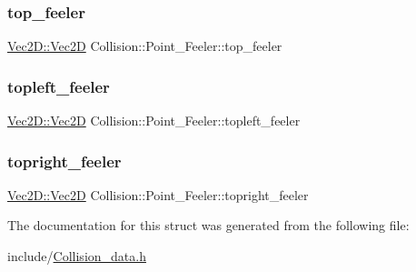 \subsubsection{\texorpdfstring{top\+\_\+feeler}{top\_feeler}}
{\footnotesize\ttfamily \mbox{\hyperlink{struct_vec2_d_1_1_vec2_d}{Vec2\+D\+::\+Vec2D}} Collision\+::\+Point\+\_\+\+Feeler\+::top\+\_\+feeler}

\mbox{\label{struct_collision_1_1_point___feeler_ac39468978fdb9bf4f3cdd1c525ae8f57}} 
\subsubsection{\texorpdfstring{topleft\+\_\+feeler}{topleft\_feeler}}
{\footnotesize\ttfamily \mbox{\hyperlink{struct_vec2_d_1_1_vec2_d}{Vec2\+D\+::\+Vec2D}} Collision\+::\+Point\+\_\+\+Feeler\+::topleft\+\_\+feeler}

\mbox{\label{struct_collision_1_1_point___feeler_ab4e5a05c06015553697c1ad85c0d0bf7}} 
\subsubsection{\texorpdfstring{topright\+\_\+feeler}{topright\_feeler}}
{\footnotesize\ttfamily \mbox{\hyperlink{struct_vec2_d_1_1_vec2_d}{Vec2\+D\+::\+Vec2D}} Collision\+::\+Point\+\_\+\+Feeler\+::topright\+\_\+feeler}



The documentation for this struct was generated from the following file\+:\begin{DoxyCompactItemize}
\item 
include/\mbox{\hyperlink{_collision__data_8h}{Collision\+\_\+data.\+h}}\end{DoxyCompactItemize}
